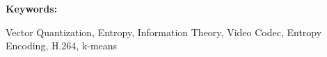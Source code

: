 \thispagestyle{plain}
\def\abstractname{Abstract}
\begin{abstract}
\end{abstract}
\vspace{0.5in}
\begin{Large}
\textbf{Keywords:}\\
\end{Large}
Vector Quantization, Entropy, Information Theory, Video Codec, Entropy Encoding, H.264, k-means 